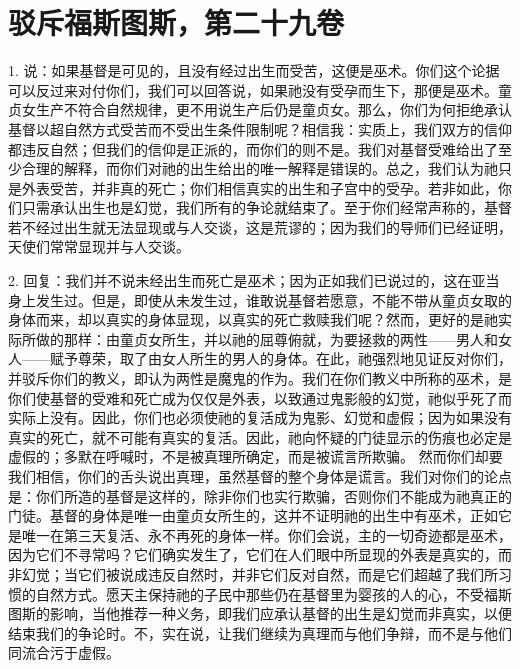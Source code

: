 

\section{驳斥福斯图斯，第二十九卷}

\par

1. 说：如果基督是可见的，且没有经过出生而受苦，这便是巫术。你们这个论据可以反过来对付你们，我们可以回答说，如果祂没有受孕而生下，那便是巫术。童贞女生产不符合自然规律，更不用说生产后仍是童贞女。那么，你们为何拒绝承认基督以超自然方式受苦而不受出生条件限制呢？相信我：实质上，我们双方的信仰都违反自然；但我们的信仰是正派的，而你们的则不是。我们对基督受难给出了至少合理的解释，而你们对祂的出生给出的唯一解释是错误的。总之，我们认为祂只是外表受苦，并非真的死亡；你们相信真实的出生和子宫中的受孕。若非如此，你们只需承认出生也是幻觉，我们所有的争论就结束了。至于你们经常声称的，基督若不经过出生就无法显现或与人交谈，这是荒谬的；因为我们的导师们已经证明，天使们常常显现并与人交谈。\par

2. 回复：我们并不说未经出生而死亡是巫术；因为正如我们已说过的，这在亚当身上发生过。但是，即使从未发生过，谁敢说基督若愿意，不能不带从童贞女取的身体而来，却以真实的身体显现，以真实的死亡救赎我们呢？然而，更好的是祂实际所做的那样：由童贞女所生，并以祂的屈尊俯就，为要拯救的两性——男人和女人——赋予尊荣，取了由女人所生的男人的身体。在此，祂强烈地见证反对你们，并驳斥你们的教义，即认为两性是魔鬼的作为。我们在你们教义中所称的巫术，是你们使基督的受难和死亡成为仅仅是外表，以致通过鬼影般的幻觉，祂似乎死了而实际上没有。因此，你们也必须使祂的复活成为鬼影、幻觉和虚假；因为如果没有真实的死亡，就不可能有真实的复活。因此，祂向怀疑的门徒显示的伤痕也必定是虚假的；多默在呼喊时，不是被真理所确定，而是被谎言所欺骗。 然而你们却要我们相信，你们的舌头说出真理，虽然基督的整个身体是谎言。我们对你们的论点是：你们所造的基督是这样的，除非你们也实行欺骗，否则你们不能成为祂真正的门徒。基督的身体是唯一由童贞女所生的，这并不证明祂的出生中有巫术，正如它是唯一在第三天复活、永不再死的身体一样。你们会说，主的一切奇迹都是巫术，因为它们不寻常吗？它们确实发生了，它们在人们眼中所显现的外表是真实的，而非幻觉；当它们被说成违反自然时，并非它们反对自然，而是它们超越了我们所习惯的自然方式。愿天主保持祂的子民中那些仍在基督里为婴孩的人的心，不受福斯图斯的影响，当他推荐一种义务，即我们应承认基督的出生是幻觉而非真实，以便结束我们的争论时。不，实在说，让我们继续为真理而与他们争辩，而不是与他们同流合污于虚假。\par

